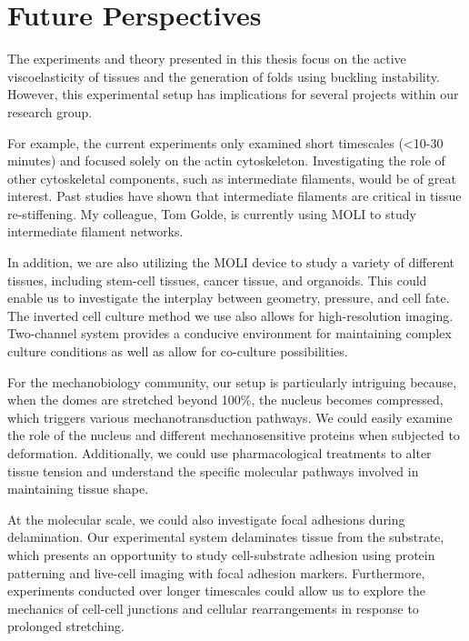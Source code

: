 \newpage
\hypertarget{future-perspectives}{%
	\section{Future Perspectives}\label{future-perspectives}}

The experiments and theory presented in this thesis focus on the active viscoelasticity of tissues and the generation of folds using buckling instability. However, this experimental setup has implications for several projects within our research group.

For example, the current experiments only examined short timescales (<10-30 minutes) and focused solely on the actin cytoskeleton. Investigating the role of other cytoskeletal components, such as intermediate filaments, would be of great interest. Past studies have shown that intermediate filaments are critical in tissue re-stiffening. My colleague, Tom Golde, is currently using MOLI to study intermediate filament networks.

In addition, we are also utilizing the MOLI device to study a variety of different tissues, including stem-cell tissues, cancer tissue, and organoids. This could enable us to investigate the interplay between geometry, pressure, and cell fate. The inverted cell culture method we use also allows for high-resolution imaging. Two-channel system provides a conducive environment for maintaining complex culture conditions as well as allow for co-culture possibilities.

For the mechanobiology community, our setup is particularly intriguing because, when the domes are stretched beyond 100\%, the nucleus becomes compressed, which triggers various mechanotransduction pathways. We could easily examine the role of the nucleus and different mechanosensitive proteins when subjected to deformation. Additionally, we could use pharmacological treatments to alter tissue tension and understand the specific molecular pathways involved in maintaining tissue shape.

At the molecular scale, we could also investigate focal adhesions during delamination. Our experimental system delaminates tissue from the substrate, which presents an opportunity to study cell-substrate adhesion using protein patterning and live-cell imaging with focal adhesion markers. Furthermore, experiments conducted over longer timescales could allow us to explore the mechanics of cell-cell junctions and cellular rearrangements in response to prolonged stretching.

